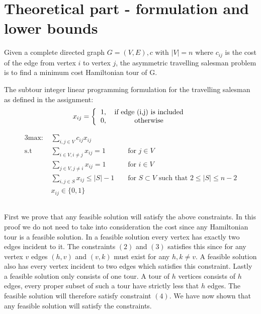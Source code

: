 \section{Theoretical part - formulation and lower bounds}
Given a complete directed graph $G = (V,E),c$ with $|V| = n$ where $c_{ij}$ is the cost of the edge from vertex $i$ to vertex $j$, the asymmetric travelling salesman problem is to find a minimum cost Hamiltonian tour of G.

The subtour integer linear programming formulation for the travelling salesman as defined in the assignment:
\[ 
x_{ij} =
\left \{
  \begin{tabular}{cc}
  1, & if edge (i,j) is included\\
  0, & otherwise 
  \end{tabular}
\right .
\]

\begin{alignat}{3}
\text{max: }    &\sum_{i,j \in V} c_{ij} x_{ij}\\
\text{s.t }     & \sum_{i \in V, i \neq j} x_{ij} = 1  && \text{ for } j \in V\\
                & \sum_{j \in V, j \neq i} x_{ij} = 1  && \text{ for } i \in V\\
                & \sum_{i,j \in S} x_{ij} \leq |S| - 1 && \text{ for } S \subset V \text{ such that } 2 \leq |S| \leq n - 2 \\
                & x_{ij} \in \{0,1\}
\end{alignat}

\subsection{} %
First we prove that any feasible solution will satisfy the above constraints. In this proof we do not need to take into consideration the cost since any Hamiltonian tour is a feasible solution. In a feasible solution every vertex has exactly two edges incident to it. The constraints $(2)$ and $(3)$ satisfies this since for any vertex $v$ edges $(h,v)$ and $(v,k)$ must exist for any $h,k \neq v$. A feasible solution also has every vertex incident to two edges which satisfies this constraint. Lastly a feasible solution only consists of one tour. A tour of $h$ vertices consists of $h$ edges, every proper subset of such a tour have strictly less that $h$ edges. The feasible solution will therefore satisfy constraint $(4)$.  We have now shown that any feasible solution will satisfy the constraints. 


